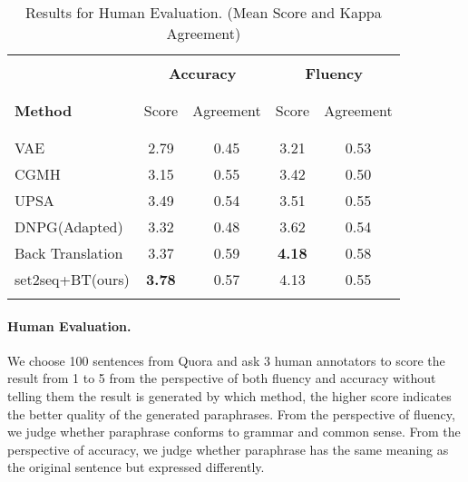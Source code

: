 \begin{table}[th]
\small
\centering
\begin{tabular}{lcccc}
\hline 
\\ [-1.8ex]
& \multicolumn{2}{c}{\textbf{Accuracy}} & \multicolumn{2}{c}{\textbf{Fluency}} \\
\\ [-1.8ex]
\cline{2-5}
\\ [-1.8ex]
\textbf{Method} & Score & Agreement & Score & Agreement \\
\\ [-2ex]
\hline
\\ [-1.8ex]
VAE  & 2.79 & 0.45 & 3.21 & 0.53 \\
CGMH & 3.15 & 0.55 & 3.42 & 0.50 \\
UPSA & 3.49 & 0.54 & 3.51 & 0.55 \\
DNPG\scriptsize{(Adapted)} & 3.32 & 0.48 & 3.62 & 0.54 \\
Back Translation & 3.37 & 0.59 & \textbf{4.18} & 0.58 \\
set2seq+BT\scriptsize{(ours)} & \textbf{3.78} &0.57 & 4.13 & 0.55 \\
\\ [-1.8ex]
\hline
\end{tabular}
\caption{\label{tab:human} Results for Human Evaluation. (Mean Score and Kappa Agreement) }
\end{table}

\paragraph{Human Evaluation.}
We choose 100 sentences from Quora and ask 3 human annotators to score the result from 1 to 5 from the perspective of both fluency and accuracy without telling them the result is generated by which method, the higher score indicates the better quality of the generated paraphrases. From the perspective of fluency, we judge whether paraphrase conforms to grammar and common sense. From the perspective of accuracy, we judge whether paraphrase has the same meaning as the original sentence but expressed differently.


